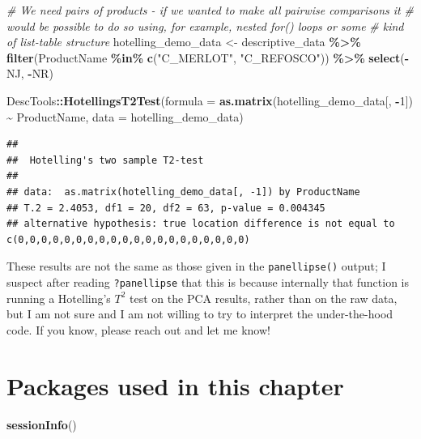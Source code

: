 \documentclass[
]{book}
\newenvironment{Shaded}{\begin{snugshade}}{\end{snugshade}}
\newcommand{\AttributeTok}[1]{\textcolor[rgb]{0.13,0.29,0.53}{#1}}
\newcommand{\CommentTok}[1]{\textcolor[rgb]{0.56,0.35,0.01}{\textit{#1}}}
\newcommand{\DecValTok}[1]{\textcolor[rgb]{0.00,0.00,0.81}{#1}}
\newcommand{\FunctionTok}[1]{\textcolor[rgb]{0.13,0.29,0.53}{\textbf{#1}}}
\newcommand{\NormalTok}[1]{#1}
\newcommand{\OtherTok}[1]{\textcolor[rgb]{0.56,0.35,0.01}{#1}}
\newcommand{\SpecialCharTok}[1]{\textcolor[rgb]{0.81,0.36,0.00}{\textbf{#1}}}
\newcommand{\StringTok}[1]{\textcolor[rgb]{0.31,0.60,0.02}{#1}}
\begin{document}
\begin{Shaded}
\begin{Highlighting}[]
\CommentTok{\# We need pairs of products {-} if we wanted to make all pairwise comparisons it}
\CommentTok{\# would be possible to do so using, for example, nested \textasciigrave{}for()\textasciigrave{} loops or some}
\CommentTok{\# kind of list{-}table structure}
\NormalTok{hotelling\_demo\_data }\OtherTok{\textless{}{-}} 
\NormalTok{  descriptive\_data }\SpecialCharTok{\%\textgreater{}\%}
  \FunctionTok{filter}\NormalTok{(ProductName }\SpecialCharTok{\%in\%} \FunctionTok{c}\NormalTok{(}\StringTok{"C\_MERLOT"}\NormalTok{, }\StringTok{"C\_REFOSCO"}\NormalTok{)) }\SpecialCharTok{\%\textgreater{}\%}
  \FunctionTok{select}\NormalTok{(}\SpecialCharTok{{-}}\NormalTok{NJ, }\SpecialCharTok{{-}}\NormalTok{NR)}

\NormalTok{DescTools}\SpecialCharTok{::}\FunctionTok{HotellingsT2Test}\NormalTok{(}\AttributeTok{formula =} \FunctionTok{as.matrix}\NormalTok{(hotelling\_demo\_data[, }\SpecialCharTok{{-}}\DecValTok{1}\NormalTok{]) }\SpecialCharTok{\textasciitilde{}}\NormalTok{ ProductName,}
                            \AttributeTok{data =}\NormalTok{ hotelling\_demo\_data)}
\end{Highlighting}
\end{Shaded}

\begin{verbatim}
## 
##  Hotelling's two sample T2-test
## 
## data:  as.matrix(hotelling_demo_data[, -1]) by ProductName
## T.2 = 2.4053, df1 = 20, df2 = 63, p-value = 0.004345
## alternative hypothesis: true location difference is not equal to c(0,0,0,0,0,0,0,0,0,0,0,0,0,0,0,0,0,0,0,0)
\end{verbatim}

These results are not the same as those given in the \texttt{panellipse()} output; I suspect after reading \texttt{?panellipse} that this is because internally that function is running a Hotelling's \(T^2\) test on the PCA results, rather than on the raw data, but I am not sure and I am not willing to try to interpret the under-the-hood code. If you know, please reach out and let me know!

\section{Packages used in this chapter}\label{packages-used-in-this-chapter-5}

\begin{Shaded}
\begin{Highlighting}[]
\FunctionTok{sessionInfo}\NormalTok{()}
\end{Highlighting}
\end{Shaded}
\end{document}
